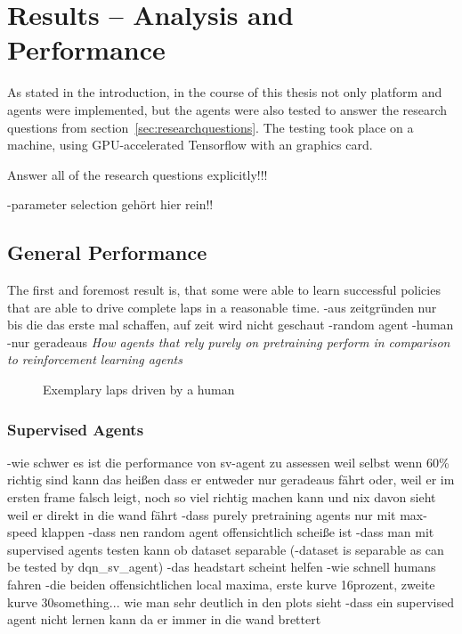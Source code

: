 \chapter{Results -- Analysis and Performance}

As stated in the introduction, in the course of this thesis not only platform and agents were implemented, but the agents were also tested to answer the research questions from section~\ref{sec:researchquestions}. The testing took place on a  machine, using GPU-accelerated Tensorflow with an  graphics card.

Answer all of the research questions explicitly!!!

-parameter selection gehört hier rein!!


\section{General Performance}

The first and foremost result is, that some were able to learn successful policies that are able to drive complete laps in a reasonable time. 
-aus zeitgründen nur bis die das erste mal schaffen, auf zeit wird nicht geschaut
-random agent
-human
-nur geradeaus
\textit{How agents that rely purely on pretraining perform in comparison to reinforcement learning agents}

\begin{figure}[h]
	{%
		\setlength{\fboxsep}{0pt}%
		\setlength{\fboxrule}{1pt}%
	}%
	\centering
	\caption{Exemplary laps driven by a human}
	\label{fig:humandrive}
\end{figure}


\subsection{Supervised Agents}

-wie schwer es ist die performance von sv-agent zu assessen weil selbst wenn 60\% richtig sind kann das heißen dass er entweder nur geradeaus fährt oder, weil er im ersten frame falsch leigt, noch so viel richtig machen kann und nix davon sieht weil er direkt in die wand fährt
-dass purely pretraining agents nur mit max-speed klappen
-dass nen random agent offensichtlich scheiße ist
-dass man mit supervised agents testen kann ob dataset separable (-dataset is separable as can be tested by dqn\_sv\_agent)
-das headstart scheint helfen
-wie schnell humans fahren
-die beiden offensichtlichen local maxima, erste kurve 16prozent, zweite kurve 30something... wie man sehr deutlich in den plots sieht
-dass ein supervised agent nicht lernen kann da er immer in die wand brettert

